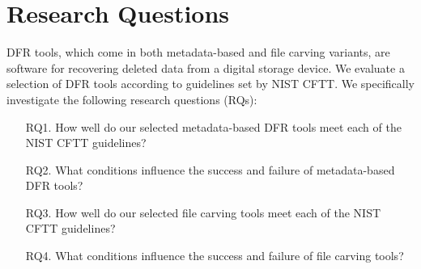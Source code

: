 \section{Research Questions}

DFR tools, which come in both metadata-based and file carving variants, are software for recovering deleted data from a digital storage device.
We evaluate a selection of DFR tools according to guidelines set by NIST CFTT.
We specifically investigate the following research questions (RQs):

\begin{itemize}
\item[RQ1.] How well do our selected metadata-based DFR tools meet each of the NIST CFTT guidelines?

\item[RQ2.] What conditions influence the success and failure of metadata-based DFR tools?

\item[RQ3.] How well do our selected file carving tools meet each of the NIST CFTT guidelines?

\item[RQ4.] What conditions influence the success and failure of file carving tools?
\end{itemize}


 
